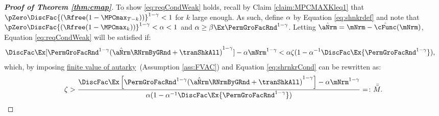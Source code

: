 \documentclass[\econtexRoot/BufferStockTheory]{subfiles}
\begin{document}
\begin{proof}[\textbf{Proof of Theorem \ref{thm:cmap}}]
To show \eqref{eq:reqCondWeak} holds, recall by Claim \ref{claim:MPCMAXKleq1} that $\pZero \DiscFac {(\Rfree (1-\MPCmax_{T-k}))}^{1-\CRRA}   < 1$ for $k$ large enough.
As such, define $\alpha$ by Equation \eqref{eq:shnkrdef} and note that $\pZero \DiscFac {(\Rfree (1-\MPCmax_{k}))}^{1-\CRRA} < \alpha < 1$ and $\alpha\geq \beta\Ex\PermGroFacRnd^{1-\CRRA}$.
Letting $\hat{\aNrm} = \mNrm - \hat{\cFunc}(\mNrm)$, Equation \eqref{eq:reqCondWeak} will be satisfied if:
%
\begin{align*}
  \DiscFac \Ex [{\PermGroFacRnd^{1-\CRRA }}{(\hat{\aNrm}\RNrmByGRnd+\tranShkAll)}^{1-\CRRA}]-\Shrinker\mNrm^{1-\CRRA}  & < \alpha\zeta(1-\alpha^{-1}\DiscFac\Ex {\PermGroFacRnd^{1-\CRRA }}),
\end{align*}
%
which, by imposing \hyperlink{FVAC}{finite value of autarky}~(Assumption \ref{ass:FVAC}) and Equation \eqref{eq:shrnkrCond} can be rewritten as:
%
\begin{equation}\begin{gathered}\begin{aligned}
      \zeta >\frac{\DiscFac \Ex\left[\PermGroFacRnd^{1-\CRRA}{(\hat{\aNrm}\RNrmByGRnd +\tranShkAll)}^{1-\CRRA}\right]- \Shrinker\mNrm^{1-\CRRA}}{\Shrinker(1-\alpha^{-1}\DiscFac\Ex {\PermGroFacRnd^{1-\CRRA }})}= \colon\bar{\bar{M}} \label{eq:KeyCondition}.
    \end{aligned}\end{gathered}\end{equation}


\end{proof}
\end{document}
